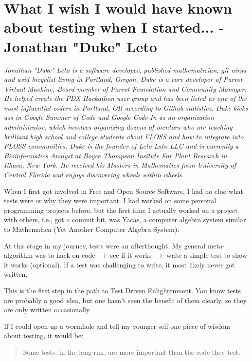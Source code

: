 \chapter{What I wish I would have known about testing when I started... - Jonathan "Duke" Leto}

\textit{Jonathan "Duke" Leto is a software developer, published mathematician, git ninja
and avid bicyclist living in Portland, Oregon. Duke is a core developer of
Parrot Virtual Machine, Board member of Parrot Foundation and Community Manager.
He helped create the PDX Hackathon user group and has been listed as one of the
most influential coders in Portland, OR according to Github statistics.
\newline
Duke kicks ass in Google Summer of Code and Google Code-In as an organization
administrator, which involves organizing dozens of mentors who are teaching
brilliant high school and college students about FLOSS and how to integrate
into FLOSS communities.
\newline
Duke is the founder of Leto Labs LLC and is currently a Bioinformatics
Analyst at Boyce Thompson Insitute For Plant Research in Ithaca, New York. He
received his Masters in Mathematics from University of Central Florida and
enjoys discovering wheels within wheels.}

When I first got involved in Free and Open Source Software, I had no clue what tests were or why they were important. I had worked on some personal programming projects before, but the first time I actually worked on a project with others, i.e., got a commit bit, was Yacas, a computer algebra system similar to Mathematica (Yet Another Computer Algebra System).

At this stage in my journey, tests were an afterthought. My general meta-algorithm was to hack on code $\rightarrow$ see if it works $\rightarrow$ write a simple test to show it works (optional). If a test was challenging to write, it most likely never got written.

This is the first step in the path to Test Driven Enlightenment. You know tests are probably a good idea, but one hasn't seen the benefit of them clearly, so they are only written occasionally.

If I could open up a wormhole and tell my younger self one piece of wisdom about testing, it would be:
\begin{quote}
Some tests, in the long-run, are more important than the code they test.                                                                        \end{quote}

